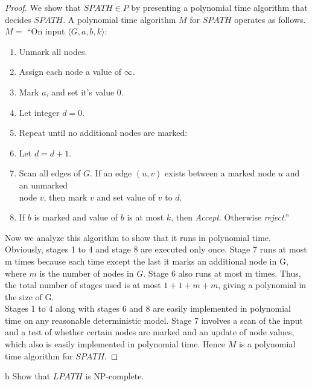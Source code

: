 \documentclass[11pt]{article}
\begin{document}
\begin{proof}
We show that $SPATH \in P$ by presenting a polynomial time algorithm that decides $SPATH$. A polynomial time algorithm $M$ for $SPATH$ operates as follows. \\

$M =$ \textquotedblleft On input $\langle G, a, b, k \rangle$:
\begin{enumerate}
\item Unmark all nodes.
\item Assign each node a value of $\infty$.
\item Mark $a$, and set it's value 0.
\item Let integer $d = 0$.
\item Repeat until no additional nodes are marked:
\item \hspace*{0.5cm} Let $d = d + 1$.
\item \hspace*{0.5cm} Scan all edges of $G$. If an edge $(u, v)$ exists between a marked node $u$ and an unmarked \\
 \hspace*{0.5cm} node $v$, then mark $v$ and set value of $v$ to $d$.
\item If $b$ is marked and value of $b$ is at most $k$, then \textit{Accept}. Otherwise \textit{reject}.\textquotedblright
\end{enumerate}

Now we analyze this algorithm to show that it runs in polynomial time. Obviously, stages 1 to 4 and stage 8 are executed only once. Stage 7 runs at most m times because each time except the last it marks an additional node in G, where $m$ is the number of nodes in $G$. Stage 6 also runs at most m times. Thus, the total number of stages used is at most $1 + 1 + m + m$, giving a polynomial in the size of G. \\

Stages 1 to 4 along with stages 6 and 8 are easily implemented in polynomial time on any reasonable deterministic model. Stage 7 involves a scan of the input and a test of
whether certain nodes are marked and an update of node values, which also is easily implemented in polynomial time. Hence $M$ is a polynomial time algorithm for $SPATH$.
\end{proof}

\newpage

\begin{problem}[Part]{b}
Show that $LPATH$ is NP-complete.
\end{problem}
\end{document}
